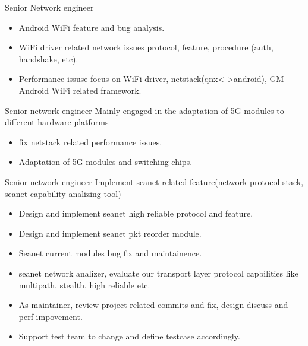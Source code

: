 \documentclass{resume}
\begin{document}



 {Senior Network engineer}
\begin{itemize}
\item Android WiFi feature and bug analysis.
\item WiFi driver related network issues protocol, feature, procedure (auth, handshake, etc).
\item Performance issuse focus on WiFi driver, netstack(qnx<->android), GM Android WiFi related framework.
\end{itemize}

 {Senior network engineer}
Mainly engaged in the adaptation of 5G modules to different hardware platforms
\begin{itemize}
\item fix netstack related performance issues.
\item Adaptation of 5G modules and switching chips.
\end{itemize}

 {Senior network engineer}
Implement seanet related feature(network protocol stack,  seanet capability analizing tool)
\begin{itemize}
\item Design and implement seanet high reliable protocol and feature.
\item Design and implement seanet pkt reorder module.
\item Seanet current modules bug fix and maintainence.
\item seanet network analizer, evaluate our transport layer protocol capbilities like multipath, stealth, high reliable etc.
\item As maintainer, review project related commits and fix, design discuss and perf impovement.
\item Support test team to change and define testcase accordingly.
\end{itemize}
\end{document}
